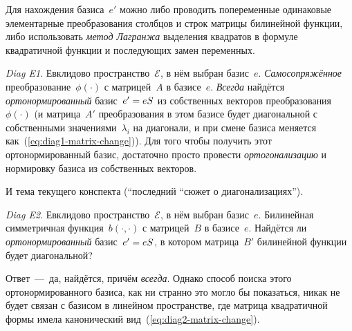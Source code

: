 \documentclass[a4paper,12pt]{article}
\theoremstyle{remark}
\begin{document}
  Для нахождения базиса~$e'$ можно либо проводить попеременные одинаковые элементарные преобразования столбцов и строк матрицы билинейной функции, либо использовать \emph{метод Лагранжа} выделения квадратов в формуле квадратичной функции и последующих замен переменных.
  
  \smallskip
  
  \emph{Diag E1}.
  Евклидово пространство~$\mathcal E$, в нём выбран базис~$e$.
  \emph{Самосопряжённое} преобразование~$\phi(\cdot)$ с матрицей~$A$ в базисе~$e$.
  \emph{Всегда} найдётся \emph{ортонормированный} базис~$e' \hm= e S$ из собственных векторов преобразования~$\phi(\cdot)$ (и матрица~$A'$ преобразования в этом базисе будет диагональной с собственными значениями~$\lambda_i$ на диагонали, и при смене базиса меняется как~(\ref{eq:diag1-matrix-change})).
  Для того чтобы получить этот ортонормированный базис, достаточно просто провести \emph{ортогонализацию} и нормировку базиса из собственных векторов.
  
  \smallskip
  
  И тема текущего конспекта (``последний ``сюжет о диагонализациях'').
  
  \smallskip
  
  \emph{Diag E2}.
  Евклидово пространство~$\mathcal E$, в нём выбран базис~$e$.
  Билинейная симметричная функция~$b(\cdot, \cdot)$ с матрицей~$B$ в базисе~$e$.
  Найдётся ли \emph{ортонормированный} базис~$e' \hm= e S$, в котором матрица~$B'$ билинейной функции будет диагональной?
  
  Ответ~---~да, найдётся, причём \emph{всегда}.
  Однако способ поиска этого ортонормированного базиса, как ни странно это могло бы показаться, никак не будет связан с базисом в линейном пространстве, где матрица квадратичной формы имела канонический вид~(\ref{eq:diag2-matrix-change}).
  
\end{document}
